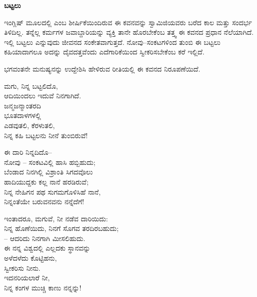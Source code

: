 \begin{myquote}
\end{myquote}

\selectkan

\begin{center}
\textbf{ಬಟ್ಟಲು}
\end{center}

ಇಂಗ್ಲಿಷ್ ಮೂಲದಲ್ಲಿ  ಎಂಬ ಶೀರ್ಷಿಕೆಯಿಂದಿರುವ ಈ ಕವನವನ್ನು ಸ್ವಾಮಿಜಿಯವರು ಬರೆದ ಕಾಲ ಮತ್ತು ಸಂದರ್ಭ ತಿಳಿದಿಲ್ಲ. ತನ್ನೆಲ್ಲ ಕರ್ಮಗಳ ಜವಾಬ್ದಾರಿಯನ್ನು ವ್ಯಕ್ತಿ ತಾನೇ ಹೊರಬೇಕೆಂಬ ತತ್ತ್ವ ಈ ಕವನದ ಪ್ರಧಾನ ನೆಲೆಯಾಗಿದೆ. ಇಲ್ಲಿ ಬಟ್ಟಲು ಎನ್ನುವುದು ಜೀವನದ ಸಂಕೇತವಾಗುತ್ತದೆ. ನೋವು–ಸಂಕಟಗಳಿಂದ ತುಂಬಿ ಈ ಬಟ್ಟಲು ಕಹಿಯಾದಾಗಲೂ ಅದನ್ನು ದೈವದತ್ತವೆಂದು ಎದೆಗಾರಿಕೆಯಿಂದ ಸ್ವೀಕರಿಸಬೇಕೆಂಬ ಕರೆ ಇಲ್ಲಿದೆ.

ಭಗವಂತನೇ ಮನುಷ್ಯನನ್ನು ಉದ್ದೇಶಿಸಿ ಹೇಳಿರುವ ರೀತಿಯಲ್ಲಿ ಈ ಕವನದ ನಿರೂಪಣೆಯಿದೆ.

\begin{myquote}
ಮಗು, ನಿನ್ನ ಬಟ್ಟಲಿದೊ,\\ಆದಿಯಿಂದಲು ಇದುವೆ ನಿನಗಾಗಿದೆ.\\ಜನ್ಮಜನ್ಮಾಂತರದಿ\\ಭೂತದಾಳಗಳಲ್ಲಿ\\ಎಡವುತಲಿ, ಕೆರಳುತಲಿ,\\ನಿನ್ನ ಕಹಿ ಬಟ್ಟಲನು ನೀನೆ ತುಂಬಿರುವೆ!
\end{myquote}

\begin{myquote}
ಈ ದಾರಿ ನಿನ್ನದಿದೊ–\\ನೋವು – ಸಂಕಟವಿಲ್ಲಿ ಹಾಸಿ ಹಬ್ಬಿಹುದು;\\ಬೆಂಡಾದ ನಿನಗಿಲ್ಲಿ ವಿಶ್ರಾಂತಿ ಸಿಗದವೊಲು\\ಹಾದಿಯುದ್ದಕು ಕಲ್ಲ ನಾನೆ ಹರಡಿರುವೆ;\\ನಿನ್ನ ನೇಹಿಗನ ಪಥ ಸುಗಮಗೊಳಿಸಿಹೆ ನಾನೆ,\\ನಿನ್ನಂತೆಯೇ ಬರುವನವನು ನನ್ನೆದೆಗೆ!
\end{myquote}

\begin{myquote}
ಇಂತಾದರೂ, ಮಗುವೆ, ನೀ ನಡೆವ ದಾರಿಯಿದು:\\ನಿನ್ನ ಹೊಣೆಯಿದು, ನಿನಗೆ ಸೊಗವ ತರದಿರಬಹುದು;\\
– ಆದರಿದು ನಿನಗಾಗಿ ಮೀಸಲಿಹುದು.\\ಈ ನನ್ನ ವಿಶ್ವದಲ್ಲಿ ಎಲ್ಲದಕು ಸ್ಥಾನವನ್ನು\\ಅಳೆದಳೆದು ಕೊಟ್ಟಿಹನು,\\ಸ್ವೀಕರಿಸು ನೀನು.\\ಇದನರಿಯಲಾರೆ ನೀ,\\ನಿನ್ನ ಕಂಗಳ ಮುಚ್ಚಿ ಕಾಣು ನನ್ನನ್ನು!
\end{myquote}

